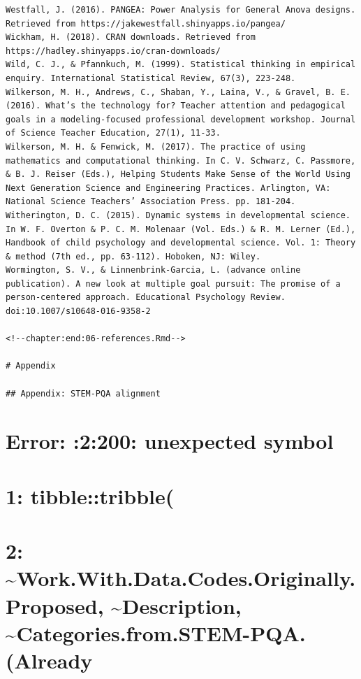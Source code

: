 \documentclass[]{msu-thesis}
\theoremstyle{definition}
\theoremstyle{definition}
\theoremstyle{definition}
\theoremstyle{remark}
\begin{document}
\begin{verbatim}
Westfall, J. (2016). PANGEA: Power Analysis for General Anova designs. Retrieved from https://jakewestfall.shinyapps.io/pangea/  
Wickham, H. (2018). CRAN downloads. Retrieved from https://hadley.shinyapps.io/cran-downloads/
Wild, C. J., & Pfannkuch, M. (1999). Statistical thinking in empirical enquiry. International Statistical Review, 67(3), 223-248.  
Wilkerson, M. H., Andrews, C., Shaban, Y., Laina, V., & Gravel, B. E. (2016). What’s the technology for? Teacher attention and pedagogical goals in a modeling-focused professional development workshop. Journal of Science Teacher Education, 27(1), 11-33.  
Wilkerson, M. H. & Fenwick, M. (2017). The practice of using mathematics and computational thinking. In C. V. Schwarz, C. Passmore, & B. J. Reiser (Eds.), Helping Students Make Sense of the World Using Next Generation Science and Engineering Practices. Arlington, VA: National Science Teachers’ Association Press. pp. 181-204.  
Witherington, D. C. (2015). Dynamic systems in developmental science. In W. F. Overton & P. C. M. Molenaar (Vol. Eds.) & R. M. Lerner (Ed.), Handbook of child psychology and developmental science. Vol. 1: Theory & method (7th ed., pp. 63-112). Hoboken, NJ: Wiley.  
Wormington, S. V., & Linnenbrink-Garcia, L. (advance online publication). A new look at multiple goal pursuit: The promise of a person-centered approach. Educational Psychology Review. doi:10.1007/s10648-016-9358-2  

<!--chapter:end:06-references.Rmd-->

# Appendix

## Appendix: STEM-PQA alignment

\end{verbatim}

\section{Error: :2:200: unexpected
symbol}\label{error-2200-unexpected-symbol}

\section{1: tibble::tribble(}\label{tibbletribble}

\section{2: \textasciitilde{}Work.With.Data.Codes.Originally.Proposed,
\textasciitilde{}Description,
\textasciitilde{}Categories.from.STEM-PQA.(Already}\label{work.with.data.codes.originally.proposed-description-categories.from.stem-pqa.already}
\end{document}
